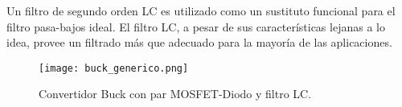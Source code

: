 Un filtro de segundo orden LC es utilizado como un sustituto funcional para el filtro pasa-bajos ideal. El filtro LC, a pesar de sus características lejanas a lo idea, provee
un filtrado más que adecuado para la mayoría de las aplicaciones.

\begin{figure}[H]
    \centering
    \texttt{[image: buck\_generico.png]}
    \vspace{-0.25cm}
    \caption{Convertidor Buck con par MOSFET-Diodo y filtro LC.}
    \label{fig:buck_practico}
\end{figure}
\vspace{-0.5cm}
\parencite{CHOI} %